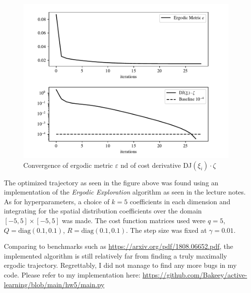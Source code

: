 \begin{figure}[h]
    \centering
    \includegraphics[]{hw5_convergence.pdf}
    \vspace{-5mm}
    \caption{Convergence of ergodic metric $\varepsilon$ nd of cost derivative DJ$(\xi_i)\cdot\zeta$}
    \label{fig:convergence}
\end{figure}
The optimized trajectory as seen in the figure above was found using an implementation of the \textit{Ergodic Exploration} algorithm as seen in the lecture notes.
As for hyperparameters, a choice of $k=5$ coefficients in each dimension and integrating for the spatial distribution coefficients over the domain $[-5,5]\times[-5,5]$ was made. 
The cost function matrices used were $q=5$, $Q=\textrm{diag}(0.1,0.1)$, $R=\textrm{diag}(0.1,0.1)$. The step size was fixed at $\gamma = 0.01.$

Comparing to benchmarks such as \url{https://arxiv.org/pdf/1808.06652.pdf}, the implemented algorithm is still relatively far from finding a truly maximally ergodic trajectory. 
Regrettably, I did not manage to find any more bugs in my code. Please refer to my implementation here: \url{https://github.com/Bakeey/active-learning/blob/main/hw5/main.py}